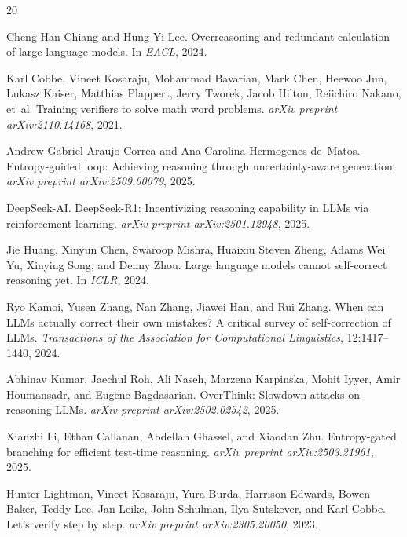 \documentclass{article}
\begin{document}

\begin{thebibliography}{20}

Cheng-Han Chiang and Hung-Yi Lee.
\newblock Overreasoning and redundant calculation of large language models.
\newblock In \emph{EACL}, 2024.

Karl Cobbe, Vineet Kosaraju, Mohammad Bavarian, Mark Chen, Heewoo Jun, Lukasz Kaiser, Matthias Plappert, Jerry Tworek, Jacob Hilton, Reiichiro Nakano, et~al.
\newblock Training verifiers to solve math word problems.
\newblock \emph{arXiv preprint arXiv:2110.14168}, 2021.

Andrew Gabriel Araujo Correa and Ana Carolina Hermogenes de~Matos.
\newblock Entropy-guided loop: Achieving reasoning through uncertainty-aware generation.
\newblock \emph{arXiv preprint arXiv:2509.00079}, 2025.

DeepSeek-AI.
\newblock DeepSeek-R1: Incentivizing reasoning capability in LLMs via reinforcement learning.
\newblock \emph{arXiv preprint arXiv:2501.12948}, 2025.

Jie Huang, Xinyun Chen, Swaroop Mishra, Huaixiu Steven Zheng, Adams Wei Yu, Xinying Song, and Denny Zhou.
\newblock Large language models cannot self-correct reasoning yet.
\newblock In \emph{ICLR}, 2024.

Ryo Kamoi, Yusen Zhang, Nan Zhang, Jiawei Han, and Rui Zhang.
\newblock When can LLMs actually correct their own mistakes? A critical survey of self-correction of LLMs.
\newblock \emph{Transactions of the Association for Computational Linguistics}, 12:1417--1440, 2024.

Abhinav Kumar, Jaechul Roh, Ali Naseh, Marzena Karpinska, Mohit Iyyer, Amir Houmansadr, and Eugene Bagdasarian.
\newblock OverThink: Slowdown attacks on reasoning LLMs.
\newblock \emph{arXiv preprint arXiv:2502.02542}, 2025.

Xianzhi Li, Ethan Callanan, Abdellah Ghassel, and Xiaodan Zhu.
\newblock Entropy-gated branching for efficient test-time reasoning.
\newblock \emph{arXiv preprint arXiv:2503.21961}, 2025.

Hunter Lightman, Vineet Kosaraju, Yura Burda, Harrison Edwards, Bowen Baker, Teddy Lee, Jan Leike, John Schulman, Ilya Sutskever, and Karl Cobbe.
\newblock Let's verify step by step.
\newblock \emph{arXiv preprint arXiv:2305.20050}, 2023.


\end{thebibliography}
\end{document}
